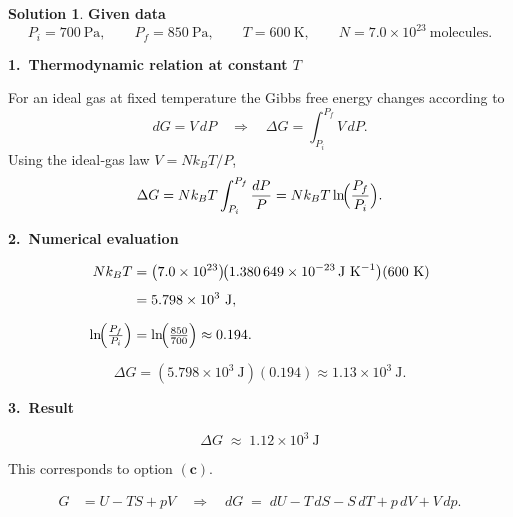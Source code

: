 \documentclass[12pt]{article}
\theoremstyle{definition} %
\newtheorem{solution}{Solution}
\theoremstyle{plain} %
\begin{document}
                \begin{solution}
                  \textbf{Given data}
                  \[
                  P_i = 700\ \text{Pa},\qquad
                  P_f = 850\ \text{Pa},\qquad
                  T   = 600\ \text{K},\qquad
                  N   = 7.0\times10^{23}\ \text{molecules}.
                  \]
                  
                  \textbf{1.\ Thermodynamic relation at constant \(T\)}  
                  
                  For an ideal gas at fixed temperature the Gibbs free energy changes according to
                  \[
                  dG = V\,dP
                  \quad\Longrightarrow\quad
                  \Delta G = \int_{P_i}^{P_f}\! V\,dP .
                  \]
                  Using the ideal‑gas law \(V = Nk_B T/P\),
                  \[
                  \Delta G = Nk_B T\int_{P_i}^{P_f}\frac{dP}{P}
                           = Nk_B T\ln\!\Bigl(\frac{P_f}{P_i}\Bigr).
                  \]
                  
                  \textbf{2.\ Numerical evaluation}
                  
                  \[
                  \begin{aligned}
                  Nk_B T
                   &= \bigl(7.0\times10^{23}\bigr)\!
                      \bigl(1.380\,649\times10^{-23}\,\text{J K}^{-1}\bigr)
                      (600\ \text{K}) \\[4pt]
                   &= 5.798\times10^{3}\ \text{J},\\[6pt]
                  \ln\!\Bigl(\tfrac{P_f}{P_i}\Bigr)
                   &= \ln\!\Bigl(\tfrac{850}{700}\Bigr)
                   \approx 0.194.
                  \end{aligned}
                  \]
                  
                  \[
                  \Delta G = (5.798\times10^{3}\ \text{J})(0.194)
                           \approx 1.13\times10^{3}\ \text{J}.
                  \]
                  
                  \textbf{3.\ Result}
                  
                  \[
                  \boxed{\Delta G \;\approx\; 1.12\times10^{3}\ \text{J}}
                  \]
                  
                  This corresponds to option \(\mathbf{(c)}\).
                  \end{solution}
                  \begin{align}
                    G &= U - TS + pV
                         \quad\Longrightarrow\quad
                    dG \;=\; dU - T\,dS - S\,dT + p\,dV + V\,dp.  \tag{1}
                    \end{align}
                    
\end{document}
